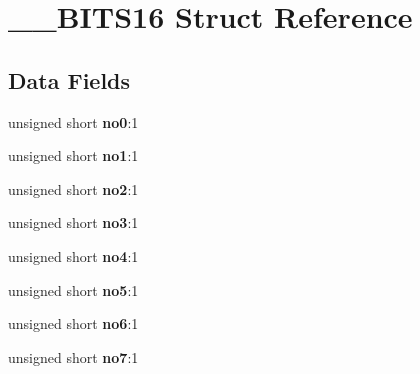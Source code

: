 \hypertarget{struct_____b_i_t_s16}{\section{\-\_\-\-\_\-\-B\-I\-T\-S16 Struct Reference}
\label{struct_____b_i_t_s16}
}
\subsection*{Data Fields}
\begin{DoxyCompactItemize}
\item 
\hypertarget{struct_____b_i_t_s16_a1679574ca10a0c6a27395f4c5289c86f}{unsigned short {\bfseries no0}\-:1}\label{struct_____b_i_t_s16_a1679574ca10a0c6a27395f4c5289c86f}

\item 
\hypertarget{struct_____b_i_t_s16_a2f7f22c03e7f6093e32e9d5cd0eb05de}{unsigned short {\bfseries no1}\-:1}\label{struct_____b_i_t_s16_a2f7f22c03e7f6093e32e9d5cd0eb05de}

\item 
\hypertarget{struct_____b_i_t_s16_a4c0fdbc51505f4b374a205341a515050}{unsigned short {\bfseries no2}\-:1}\label{struct_____b_i_t_s16_a4c0fdbc51505f4b374a205341a515050}

\item 
\hypertarget{struct_____b_i_t_s16_a38d18c17c39b608bbeb735fd735318e9}{unsigned short {\bfseries no3}\-:1}\label{struct_____b_i_t_s16_a38d18c17c39b608bbeb735fd735318e9}

\item 
\hypertarget{struct_____b_i_t_s16_adce062d8022ecafba693beba7647017b}{unsigned short {\bfseries no4}\-:1}\label{struct_____b_i_t_s16_adce062d8022ecafba693beba7647017b}

\item 
\hypertarget{struct_____b_i_t_s16_ad684b314cf85223cc506a4f1c4c69e2d}{unsigned short {\bfseries no5}\-:1}\label{struct_____b_i_t_s16_ad684b314cf85223cc506a4f1c4c69e2d}

\item 
\hypertarget{struct_____b_i_t_s16_ac11c9dcd99e4e7b489d9d2d31465386a}{unsigned short {\bfseries no6}\-:1}\label{struct_____b_i_t_s16_ac11c9dcd99e4e7b489d9d2d31465386a}

\item 
\hypertarget{struct_____b_i_t_s16_a09c4e9871ee7f0b3944f71eaa2e8a746}{unsigned short {\bfseries no7}\-:1}\label{struct_____b_i_t_s16_a09c4e9871ee7f0b3944f71eaa2e8a746}


\end{DoxyCompactItemize}
